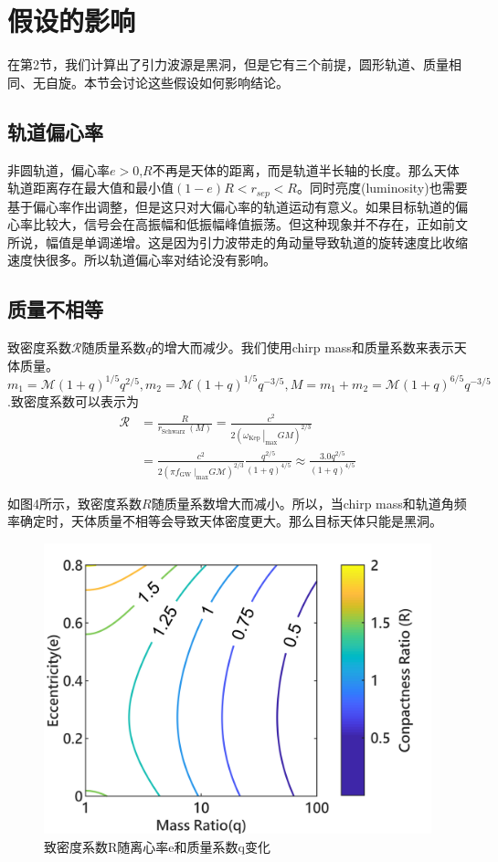 \documentclass[UTF8]{ctexart}
\begin{document}
\section{假设的影响}
在第2节，我们计算出了引力波源是黑洞，但是它有三个前提，圆形轨道、质量相同、无自旋。本节会讨论这些假设如何影响结论。
\subsection{轨道偏心率}
非圆轨道，偏心率$e>0$,$R$不再是天体的距离，而是轨道半长轴的长度。那么天体轨道距离存在最大值和最小值$(1-e)R<r_{sep}<R$。同时亮度(luminosity)也需要基于偏心率作出调整，但是这只对大偏心率的轨道运动有意义。如果目标轨道的偏心率比较大，信号会在高振幅和低振幅峰值振荡。但这种现象并不存在，正如前文所说，幅值是单调递增。这是因为引力波带走的角动量导致轨道的旋转速度比收缩速度快很多。所以轨道偏心率对结论没有影响。
\subsection{质量不相等}
致密度系数$\mathscr{R}$随质量系数$q$的增大而减少。我们使用chirp mass和质量系数来表示天体质量。$m_1=\mathscr{M}(1+q)^{1/5}q^{2/5},m_2 = \mathscr{M}(1+q)^{1/5}q^{-3/5},M=m_1+m_2=\mathscr{M}(1+q)^{6/5}q^{-3/5}$.致密度系数可以表示为
\begin{equation}
\begin{aligned}
\mathscr{R} &=\frac{R}{r_{\text {Schwarz }}(M)}=\frac{c^{2}}{2\left(\left.\omega_{\text {Kep }}\right|_{\max } G M\right)^{2 / 3}} \\
&=\frac{c^{2}}{2\left(\left.\pi f_{\text {GW }}\right|_{\max } G \mathscr{M}\right)^{2 / 3}} \frac{q^{2 / 5}}{(1+q)^{4 / 5}} \approx \frac{3.0 q^{2 / 5}}{(1+q)^{4 / 5}}
\end{aligned}
\end{equation}

如图4所示，致密度系数$R$随质量系数增大而减小。所以，当chirp mass和轨道角频率确定时，天体质量不相等会导致天体密度更大。那么目标天体只能是黑洞。

\begin{figure}[!htbp]
	\centering
	\includegraphics{figure-5.png}
	\caption{致密度系数R随离心率e和质量系数q变化}
\end{figure}
\end{document}
